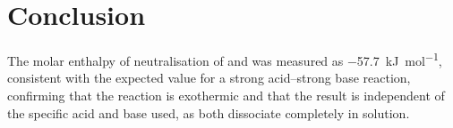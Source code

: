 \documentclass[a4paper,11pt]{article}
\begin{document}
\section*{Conclusion}

The molar enthalpy of neutralisation of  and  was measured
as \SI{-57.7}{\kilo\joule\per\mole}, consistent with the expected value for
a strong acid--strong base reaction, confirming that the reaction is
exothermic and that the result is independent of the specific acid and base
used, as both dissociate completely in solution.



\end{document}
